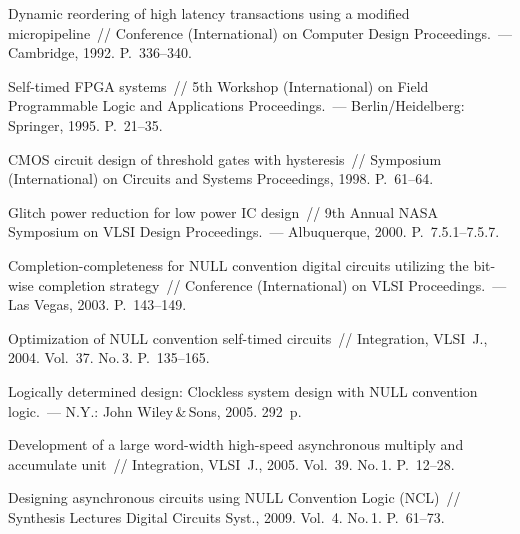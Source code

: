 \begin{multicols}{2}
{{\begin{thebibliography}{99}
 Dynamic reordering of high latency transactions using a 
modified micropipeline~// Conference (International) on Computer Design Proceedings.~--- 
Cambridge, 1992. P.~336--340.

 Self-timed FPGA systems~// 5th Workshop (International) on Field Programmable 
Logic and Applications Proceedings.~--- Berlin/Heidelberg: Springer, 1995. P.~21--35.


 CMOS circuit design of threshold gates with hysteresis~// 
Symposium (International) on Circuits and Systems Proceedings, 1998. P.~61--64.

 Glitch power reduction 
for low power IC design~// 9th Annual NASA Symposium on VLSI Design Proceedings.~--- 
Albuquerque, 2000. P.~7.5.1--7.5.7.

 Completion-completeness for NULL convention digital circuits utilizing the 
bit-wise completion strategy~// Conference (International) on VLSI Proceedings.~--- Las Vegas, 
2003. P.~143--149.

 Optimization of NULL 
convention self-timed circuits~// Integration, VLSI~J., 2004. Vol.~37. No.\,3. P.~135--165.

 Logically determined design: Clockless system design with NULL convention 
logic.~--- N.Y.: John Wiley\,\&\,Sons, 2005. 292~p.

 Development of a large word-width high-speed asynchronous multiply and 
accumulate unit~// Integration, VLSI~J., 2005. Vol.~39. No.\,1. P.~12--28.

 Designing asynchronous circuits using NULL Convention Logic 
(NCL)~// Synthesis Lectures Digital Circuits Syst., 2009. Vol.~4. No.\,1. P.~61--73.




\end{thebibliography}}}
\end{multicols}
